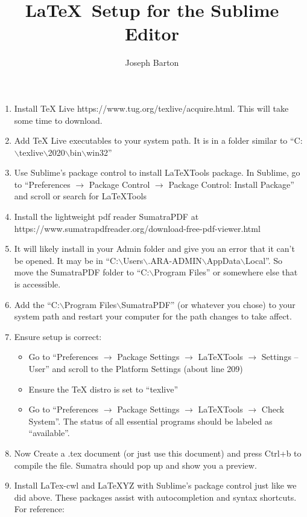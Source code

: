 \documentclass{article}
\title{\LaTeX \ Setup for the Sublime Editor}
\author{Joseph Barton}
\date{}
\begin{document}
\maketitle

\begin{enumerate}
\item Install TeX Live https://www.tug.org/texlive/acquire.html. This will take some time to download.
\item Add TeX Live executables to your system path. It is in a folder similar to ``C:$ \backslash $texlive$ \backslash $2020$ \backslash $bin$ \backslash $win32''
\item Use Sublime's package control to install LaTeXTools package. In Sublime, go to ``Preferences $\rightarrow$ Package Control $\rightarrow$ Package Control: Install Package'' and scroll or search for LaTeXTools
\item Install the lightweight pdf reader SumatraPDF at https://www.sumatrapdfreader.org/download-free-pdf-viewer.html
\item It will likely install in your Admin folder and give you an error that it can't be opened.  It may be in ``C:$ \backslash $Users$ \backslash $.ARA-ADMIN$ \backslash $AppData$ \backslash $Local''. So move the SumatraPDF folder to ``C:$ \backslash $Program Files'' or somewhere else that is accessible.
\item Add the ``C:$ \backslash $Program Files$ \backslash $SumatraPDF'' (or whatever you chose) to your system path and restart your computer for the path changes to take affect.
\item Ensure setup is correct:
	\begin{itemize}
	\item Go to ``Preferences $\rightarrow$ Package Settings $\rightarrow$ LaTeXTools $\rightarrow$ Settings -- User'' and scroll to the Platform Settings (about line 209)
	\item Ensure the TeX distro is set to ``texlive''
	\item Go to ``Preferences $\rightarrow$ Package Settings $\rightarrow$ LaTeXTools $\rightarrow$ Check System''. The status of all essential programs should be labeled as ``available''.
	\end{itemize}
\item Now Create a .tex document (or just use this document) and press Ctrl+b to compile the file. Sumatra should pop up and show you a preview.
\item Install LaTex-cwl and LaTeXYZ with Sublime's package control just like we did above. These packages assist with autocompletion and syntax shortcuts. For reference:

\end{enumerate}
\end{document}
